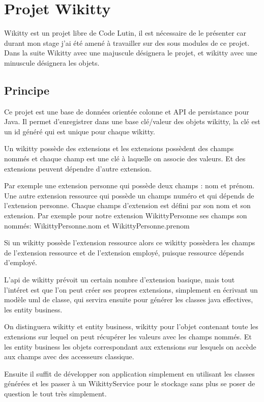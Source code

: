\section{Projet Wikitty}

Wikitty est un projet libre de Code Lutin, il est nécessaire de le présenter car
durant mon stage j'ai été amené à travailler sur des sous modules de ce projet.
Dans la suite Wikitty avec une majuscule désignera le projet, et wikitty avec
une minuscule désignera les objets.

\subsection{Principe}

Ce projet est une base de données orientée colonne et API de persistance pour
Java. Il permet d'enregistrer dans une base clé/valeur des objets wikitty, la
clé est un id généré qui est unique pour chaque wikitty. 

Un wikitty possède des extensions et les extensions possèdent des champs nommés
et chaque champ est une clé à laquelle on associe des valeurs. Et des extensions
peuvent dépendre d'autre extension.

Par exemple une extension personne qui possède deux champs : nom et prénom.
Une autre extension ressource qui possède un champs numéro et qui dépends de
l'extension personne. Chaque champs d'extension est défini par son nom et son 
extension. Par exemple pour notre extension WikittyPersonne ses champs son nommés:
WikittyPersonne.nom et WikittyPersonne.prenom

Si un wikitty possède l'extension ressource alors ce wikitty possèdera les
champs de l'extension ressource et de l'extension employé, puisque ressource
dépends d'employé.

L'api de wikitty prévoit un certain nombre d'extension basique, mais tout
l'intéret est que l'on peut créer ses propres extensions, simplement en écrivant
un modèle uml de classe, qui servira ensuite pour générer les classes java
effectives, les entity business.

On distinguera wikitty et entity business, wikitty pour l'objet contenant toute
les extensions sur lequel on peut récupérer les valeurs avec les champs nommés.
Et les entity business les objets correspondant aux extensions sur lesquels 
on accède aux champs avec des accesseurs classique.

Ensuite il suffit de développer son application simplement en utilisant les
classes générées et les passer à un WikittyService pour le stockage sans plus
se poser de question le tout très simplement.

